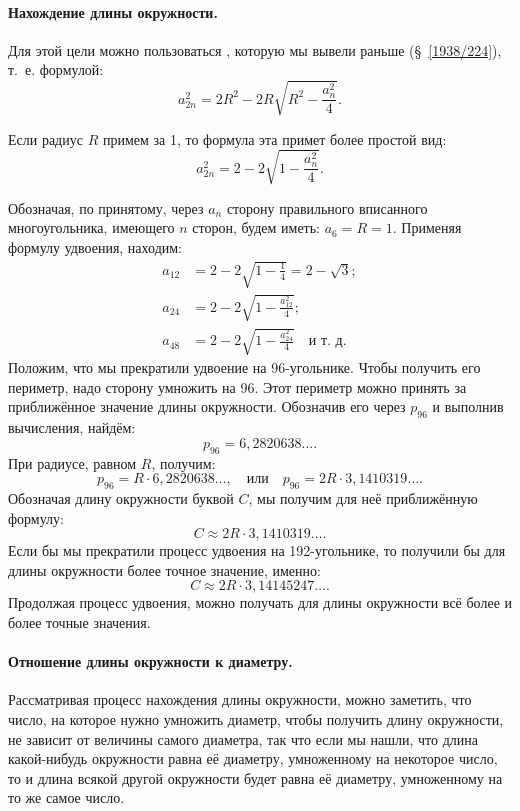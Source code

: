 \documentclass[oneside]{book}
\begin{document}
\paragraph{Нахождение длины окружности.}\label{1938/237}
Для этой цели можно пользоваться , которую мы вывели раньше (§~\ref{1938/224}), т.~е. формулой:
\[a_{2n}^2=2R^2-2R\sqrt{R^2-\frac{a_n^2}4}.\]

Если радиус $R$ примем за 1, то формула эта примет более простой вид:
\[a_{2n}^2=2-2\sqrt{1-\frac{a_n^2}4}.\]


Обозначая, по принятому, через $a_n$ сторону правильного вписанного многоугольника, имеющего $n$ сторон, будем иметь:
$a_6=R=1$.
Применяя формулу удвоения, находим:
\begin{align*}
a_{12}&=2-2\sqrt{1-\tfrac14}=2-\sqrt3;
\\
a_{24}&=2-2\sqrt{1-\tfrac{a_{12}^2}{4}};
\\
a_{48}&=2-2\sqrt{1-\tfrac{a_{24}^2}{4}}\quad\text{и т.~д.}
\end{align*}
Положим, что мы прекратили удвоение на 96-угольнике.
Чтобы получить его периметр, надо сторону умножить на 96.
Этот периметр можно принять за приближённое значение длины окружности.
Обозначив его через $p_{96}$ и выполнив вычисления, найдём:
\[p_{96} = 6{,}2820638\dots.\]
При радиусе, равном $R$, получим:
\[p_{96}=R\cdot6{,}2820638\dots,
\quad\text{или}\quad
p_{96}=2R\cdot3{,}1410319\dots.\]
Обозначая длину окружности буквой $C$, мы получим для неё приближённую формулу:
\[C\approx 2R\cdot3{,}1410319\dots.\]
Если бы мы прекратили процесс удвоения на 192-угольнике, то получили бы для длины окружности более точное значение, именно:
\[C\approx2R\cdot3{,}14145247\dots.\]
Продолжая процесс удвоения, можно получать для длины окружности всё более и более точные значения.


\paragraph{Отношение длины окружности к диаметру.}\label{1938/238}
Рассматривая процесс нахождения длины окружности, можно заметить, что число, на которое нужно умножить диаметр, чтобы получить длину окружности, не зависит от величины самого диаметра, так что если мы нашли, что длина какой-нибудь окружности равна её диаметру, умноженному на некоторое число, то и длина всякой другой окружности будет равна её диаметру, умноженному на то же самое число.
\end{document}
